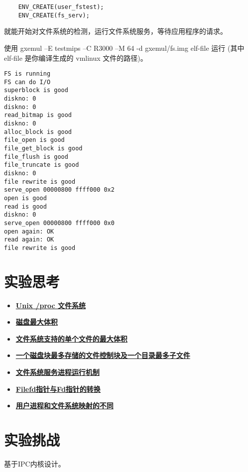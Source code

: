 \begin{verbatim}
    ENV_CREATE(user_fstest);
    ENV_CREATE(fs_serv);
\end{verbatim}

就能开始对文件系统的检测，运行文件系统服务，等待应用程序的请求。

\begin{note}
使用 gxemul –E testmips –C R3000 –M 64 -d gxemul/fs.img elf-file 运行 (其中 elf-file 是你编译生成的 vmlinux 文件的路径)。 
\end{note}

\begin{verbatim}
FS is running
FS can do I/O
superblock is good
diskno: 0
diskno: 0
read_bitmap is good
diskno: 0
alloc_block is good
file_open is good
file_get_block is good
file_flush is good
file_truncate is good
diskno: 0
file rewrite is good
serve_open 00000800 ffff000 0x2
open is good
read is good
diskno: 0
serve_open 00000800 ffff000 0x0
open again: OK
read again: OK
file rewrite is good
\end{verbatim}

\section{实验思考}

\begin{itemize}
\item \hyperref[think-proc]{\textbf{\textcolor{baseB}{Unix /proc 文件系统}}}
\item \hyperref[think-disksize]{\textbf{\textcolor{baseB}{磁盘最大体积}}}
\item \hyperref[think-filesize]{\textbf{\textcolor{baseB}{文件系统支持的单个文件的最大体积}}}
\item \hyperref[think-filenum]{\textbf{\textcolor{baseB}{一个磁盘块最多存储的文件控制块及一个目录最多子文件}}}
\item \hyperref[think-fs-serve]{\textbf{\textcolor{baseB}{文件系统服务进程运行机制}}}
\item \hyperref[think-Filefd-Fd]{\textbf{\textcolor{baseB}{Filefd指针与Fd指针的转换}}}
\item \hyperref[think-fileid]{\textbf{\textcolor{baseB}{用户进程和文件系统映射的不同}}}
\end{itemize}

\section{实验挑战}

基于IPC内核设计。




